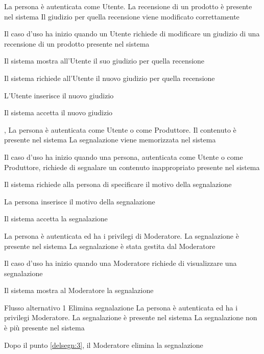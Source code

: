 {}
{La persona è autenticata come Utente. La recensione di un prodotto è presente nel sistema}
{Il giudizio per quella recensione viene modificato correttamente}
{\begin{enumCU}
	\item Il caso d'uso ha inizio quando un Utente richiede di modificare un giudizio di una recensione di un prodotto presente nel sistema
	\item Il sistema mostra all'Utente il suo giudizio per quella recensione
	\item Il sistema richiede all'Utente il nuovo giudizio per quella recensione
	\item L'Utente inserisce il nuovo giudizio
	\item Il sistema accetta il nuovo giudizio
\end{enumCU}}

\tabcuvspace

{, }
{La persona è autenticata come Utente o come Produttore. Il contenuto è presente nel sistema}
{La segnalazione viene memorizzata nel sistema}
{\begin{enumCU}
	\item Il caso d'uso ha inizio quando una persona, autenticata come Utente o come Produttore, richiede di segnalare un contenuto inappropriato presente nel sistema
	\item Il sistema richiede alla persona di specificare il motivo della segnalazione
	\item La persona inserisce il motivo della segnalazione
	\item Il sistema accetta la segnalazione
\end{enumCU}}

\tabcuvspace

{}
{La persona è autenticata ed ha i privilegi di Moderatore. La segnalazione è presente nel sistema}
{La segnalazione è stata gestita dal Moderatore}
{\begin{enumCU}
	\item Il caso d'uso ha inizio quando una Moderatore richiede di visualizzare una segnalazione
	\item Il sistema mostra al Moderatore la segnalazione \label{delsegn:3}
\end{enumCU}}
%
{Flusso alternativo 1}%
{Elimina segnalazione}%
{La persona è autenticata ed ha i privilegi Moderatore. La segnalazione è presente nel sistema}
{La segnalazione non è più presente nel sistema}%
{\begin{enumCU}
		\item Dopo il punto \ref{delsegn:3}, il Moderatore elimina la segnalazione
\end{enumCU}}%

